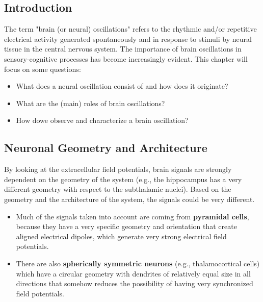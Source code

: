 \subsection{Introduction}
The term "brain (or neural) oscillations" refers to the rhythmic and/or repetitive electrical 
activity generated spontaneously and in response to stimuli by neural tissue in the central 
nervous system. The importance of brain oscillations in sensory-cognitive processes has become 
increasingly evident. This chapter will focus on some questions:
\begin{itemize}
    \item What does a neural oscillation consist of and how does it originate?
    \item What are the (main) roles of brain oscillations?
    \item How dowe observe and characterize a brain oscillation?
\end{itemize}

\subsection{Neuronal Geometry and Architecture}
By looking at the extracellular field potentials, brain signals are strongly dependent on the 
geometry of the system (e.g., the hippocampus has a very different geometry with respect to 
the subthalamic nuclei). Based on the geometry and the architecture of the system, the signals 
could be very different.
\begin{itemize}
    \item Much of the signals taken into account are coming from \textbf{pyramidal cells}, because they have a very 
    specific geometry and orientation that create aligned electrical dipoles, which generate very strong 
    electrical field potentials.
    \item There are also \textbf{spherically symmetric neurons} (e.g., thalamocortical cells) which have a circular 
    geometry with dendrites of relatively equal size in all directions that somehow reduces the possibility of 
    having very synchronized field potentials.
\end{itemize}

